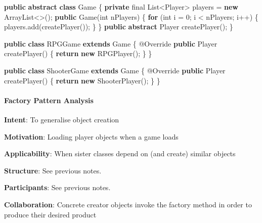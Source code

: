 \documentclass[]{article}
\newenvironment{Shaded}{}{}
\newcommand{\AttributeTok}[1]{\textcolor[rgb]{0.49,0.56,0.16}{#1}}
\newcommand{\BuiltInTok}[1]{#1}
\newcommand{\DataTypeTok}[1]{\textcolor[rgb]{0.56,0.13,0.00}{#1}}
\newcommand{\DecValTok}[1]{\textcolor[rgb]{0.25,0.63,0.44}{#1}}
\newcommand{\FunctionTok}[1]{\textcolor[rgb]{0.02,0.16,0.49}{#1}}
\newcommand{\KeywordTok}[1]{\textcolor[rgb]{0.00,0.44,0.13}{\textbf{#1}}}
\newcommand{\NormalTok}[1]{#1}
\let\oldparagraph\paragraph
\renewcommand{\paragraph}[1]{\oldparagraph{#1}\mbox{}}
\begin{document}
\begin{Shaded}
\begin{Highlighting}[]
\KeywordTok{public} \KeywordTok{abstract} \KeywordTok{class}\NormalTok{ Game \{}
    \KeywordTok{private} \DataTypeTok{final} \BuiltInTok{List}\NormalTok{<Player> players = }\KeywordTok{new} \BuiltInTok{ArrayList}\NormalTok{<>();}
    \KeywordTok{public} \FunctionTok{Game}\NormalTok{(}\DataTypeTok{int}\NormalTok{ nPlayers) \{}
        \KeywordTok{for}\NormalTok{ (}\DataTypeTok{int}\NormalTok{ i = }\DecValTok{0}\NormalTok{; i < nPlayers; i++) \{}
\NormalTok{            players.}\FunctionTok{add}\NormalTok{(}\FunctionTok{createPlayer}\NormalTok{());}
\NormalTok{        \}}
\NormalTok{    \}}
    \KeywordTok{public} \KeywordTok{abstract}\NormalTok{ Player }\FunctionTok{createPlayer}\NormalTok{();}
\NormalTok{\}}

\KeywordTok{public} \KeywordTok{class}\NormalTok{ RPGGame }\KeywordTok{extends}\NormalTok{ Game \{}
    \AttributeTok{@Override}
    \KeywordTok{public}\NormalTok{ Player }\FunctionTok{createPlayer}\NormalTok{() \{}
        \KeywordTok{return} \KeywordTok{new} \FunctionTok{RPGPlayer}\NormalTok{();}
\NormalTok{    \}}
\NormalTok{\}}

\KeywordTok{public} \KeywordTok{class}\NormalTok{ ShooterGame }\KeywordTok{extends}\NormalTok{ Game \{}
    \AttributeTok{@Override}
    \KeywordTok{public}\NormalTok{ Player }\FunctionTok{createPlayer}\NormalTok{() \{}
        \KeywordTok{return} \KeywordTok{new} \FunctionTok{ShooterPlayer}\NormalTok{();}
\NormalTok{    \}}
\NormalTok{\}}
\end{Highlighting}
\end{Shaded}

\hypertarget{factory-pattern-analysis}{%
\paragraph{Factory Pattern Analysis}\label{factory-pattern-analysis}}

\textbf{Intent}: To generalise object creation

\textbf{Motivation}: Loading player objects when a game loads

\textbf{Applicability}: When sister classes depend on (and create)
similar objects

\textbf{Structure}: See previous notes.

\textbf{Participants}: See previous notes.

\textbf{Collaboration}: Concrete creator objects invoke the factory
method in order to produce their desired product
\end{document}
